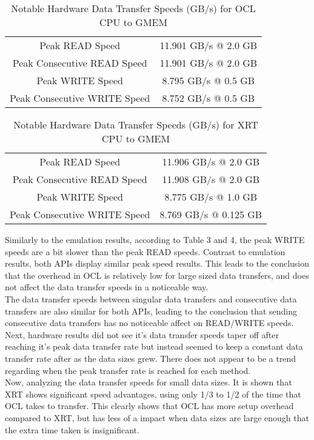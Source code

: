 \begin{table}[H]
    \centering
    \begin{tabular}{c|c}
         Peak READ Speed & 11.901 GB/s @ 2.0 GB \\
         Peak Consecutive READ Speed & 11.901 GB/s @ 2.0 GB \\
         Peak WRITE Speed & 8.795 GB/s @ 0.5 GB \\
         Peak Consecutive WRITE Speed & 8.752 GB/s @ 0.5 GB \\
    \end{tabular}
    \caption{Notable Hardware Data Transfer Speeds (GB/s) for OCL CPU to GMEM}
    \label{tab:my_label}
\end{table}

\begin{table}[H]
    \centering
    \begin{tabular}{c|c}
         Peak READ Speed & 11.906 GB/s @ 2.0 GB \\
         Peak Consecutive READ Speed & 11.908 GB/s @ 2.0 GB \\
         Peak WRITE Speed &  8.775 GB/s @ 1.0 GB \\
         Peak Consecutive WRITE Speed & 8.769 GB/s @ 0.125 GB \\
    \end{tabular}
    \caption{Notable Hardware Data Transfer Speeds (GB/s) for XRT CPU to GMEM}
    \label{tab:my_label}
\end{table}

Similarly to the emulation results, according to Table 3 and 4, the peak WRITE speeds are a bit slower than the peak READ speeds. Contrast to emulation results, both APIs display similar peak speed results. This leads to the conclusion that the overhead in OCL is relatively low for large sized data transfers, and does not affect the data transfer speeds in a noticeable way. \\

The data transfer speeds between singular data transfers and consecutive data transfers are also similar for both APIs, leading to the conclusion that sending consecutive data transfers has no noticeable affect on READ/WRITE speeds. Next, hardware results did not see it's data transfer speeds taper off after reaching it's peak data transfer rate but instead seemed to keep a constant data transfer rate after as the data sizes grew. There does not appear to be a trend regarding when the peak transfer rate is reached for each method. \\

Now, analyzing the data transfer speeds for small data sizes. It is shown that XRT shows significant speed advantages, using only 1/3 to 1/2 of the time that OCL takes to transfer. This clearly shows that OCL has more setup overhead compared to XRT, but has less of a impact when data sizes are large enough that the extra time taken is insignificant.